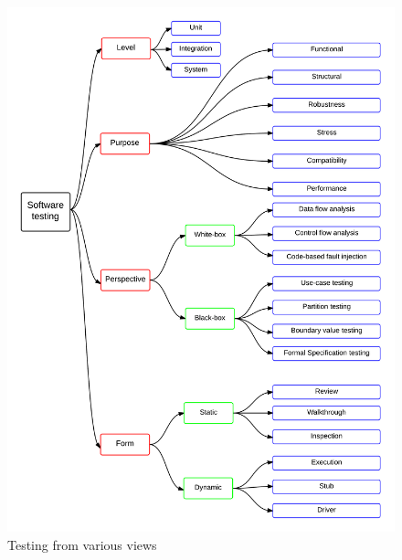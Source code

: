 \begin{figure}[H]
	\centering
	\centerline{\includegraphics[width=\textwidth]{chapter2/softwareTestingFlow.png}}
	\caption{Testing from various views}
	\label{fig:softwareTestingFlow_2}
\end{figure}



